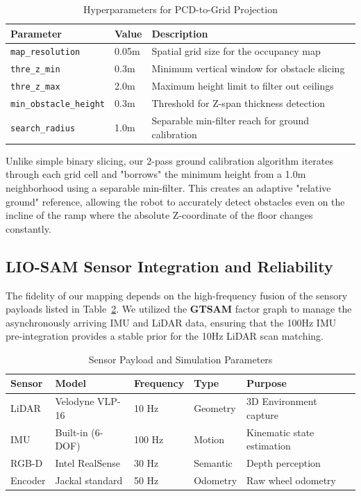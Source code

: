 \documentclass[11pt, a4paper]{article}
\begin{document}
\begin{table}[htbp]
\centering
\caption{Hyperparameters for PCD-to-Grid Projection}
\label{tab:mapping_params}
\begin{tabular}{@{}lll@{}}
\toprule
\textbf{Parameter} & \textbf{Value} & \textbf{Description} \\ \midrule
\texttt{map\_resolution} & 0.05m & Spatial grid size for the occupancy map \\
\texttt{thre\_z\_min} & 0.3m & Minimum vertical window for obstacle slicing \\
\texttt{thre\_z\_max} & 2.0m & Maximum height limit to filter out ceilings \\
\texttt{min\_obstacle\_height} & 0.3m & Threshold for Z-span thickness detection \\
\texttt{search\_radius} & 1.0m & Separable min-filter reach for ground calibration \\
\bottomrule
\end{tabular}
\end{table}

Unlike simple binary slicing, our 2-pass ground calibration algorithm iterates through each grid cell and "borrows" the minimum height from a 1.0m neighborhood using a separable min-filter. This creates an adaptive "relative ground" reference, allowing the robot to accurately detect obstacles even on the incline of the ramp where the absolute Z-coordinate of the floor changes constantly.

\subsection{LIO-SAM Sensor Integration and Reliability}
The fidelity of our mapping depends on the high-frequency fusion of the sensory payloads listed in Table~\ref{tab:sensor_specs}. We utilized the \textbf{GTSAM} factor graph to manage the asynchronously arriving IMU and LiDAR data, ensuring that the 100Hz IMU pre-integration provides a stable prior for the 10Hz LiDAR scan matching.

\begin{table}[htbp]
\centering
\caption{Sensor Payload and Simulation Parameters}
\label{tab:sensor_specs}
\begin{tabular}{@{}lllll@{}}
\toprule
\textbf{Sensor} & \textbf{Model} & \textbf{Frequency} & \textbf{Type} & \textbf{Purpose} \\ 
\midrule
LiDAR & Velodyne VLP-16 & 10 Hz & Geometry & 3D Environment capture \\
IMU & Built-in (6-DOF) & 100 Hz & Motion & Kinematic state estimation \\
RGB-D & Intel RealSense & 30 Hz & Semantic & Depth perception \\
Encoder & Jackal standard & 50 Hz & Odometry & Raw wheel odometry \\
\bottomrule
\end{tabular}
\end{table}
\end{document}
